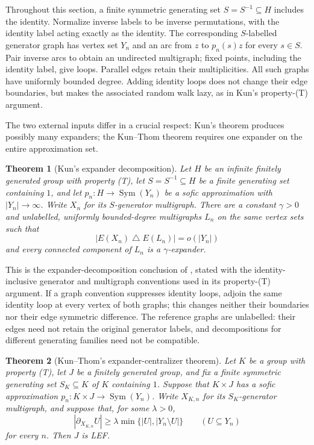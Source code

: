 \documentclass[10pt]{article}
\newtheorem{theorem}{Theorem}[section]
\newcommand{\Sym}{\operatorname{Sym}}
\newcommand{\abs}[1]{\left|#1\right|}
\begin{document}
Throughout this section, a finite symmetric generating set $S=S^{-1}\subseteq H$ includes the identity. Normalize inverse labels to be inverse permutations, with the identity label acting exactly as the identity. The corresponding $S$-labelled generator graph has vertex set $Y_n$ and an arc from $z$ to $p_n(s)z$ for every $s\in S$. Pair inverse arcs to obtain an undirected multigraph; fixed points, including the identity label, give loops. Parallel edges retain their multiplicities. All such graphs have uniformly bounded degree. Adding identity loops does not change their edge boundaries, but makes the associated random walk lazy, as in Kun's property-(T) argument.

The two external inputs differ in a crucial respect: Kun's theorem produces possibly many expanders; the Kun--Thom theorem requires one expander on the entire approximation set.

\begin{theorem}[Kun's expander decomposition]
Let $H$ be an infinite finitely generated group with property (T), let $S=S^{-1}\subseteq H$ be a finite generating set containing $1$, and let $p_n:H\to\Sym(Y_n)$ be a sofic approximation with $\abs{Y_n}\to\infty$. Write $X_n$ for its $S$-generator multigraph. There are a constant $\gamma>0$ and unlabelled, uniformly bounded-degree multigraphs $L_n$ on the same vertex sets such that
\[
\abs{E(X_n)\mathbin{\triangle}E(L_n)}=o(\abs{Y_n})
\]
and every connected component of $L_n$ is a $\gamma$-expander.
\end{theorem}

This is the expander-decomposition conclusion of \cite[Theorem~1]{Kun19}, stated with the identity-inclusive generator and multigraph conventions used in its property-(T) argument. If a graph convention suppresses identity loops, adjoin the same identity loop at every vertex of both graphs; this changes neither their boundaries nor their edge symmetric difference. The reference graphs are unlabelled: their edges need not retain the original generator labels, and decompositions for different generating families need not be compatible.

\begin{theorem}[Kun--Thom's expander-centralizer theorem]
Let $K$ be a group with property (T), let $J$ be a finitely generated group, and fix a finite symmetric generating set $S_K\subseteq K$ of $K$ containing $1$. Suppose that $K\times J$ has a sofic approximation $p_n:K\times J\to\Sym(Y_n)$. Write $X_{K,n}$ for its $S_K$-generator multigraph, and suppose that, for some $\lambda>0$,
\[
\abs{\partial_{X_{K,n}}U}\geq\lambda\min\{\abs{U},\abs{Y_n\setminus U}\}\qquad(U\subseteq Y_n)
\]
for every $n$. Then $J$ is LEF.
\end{theorem}
\end{document}
